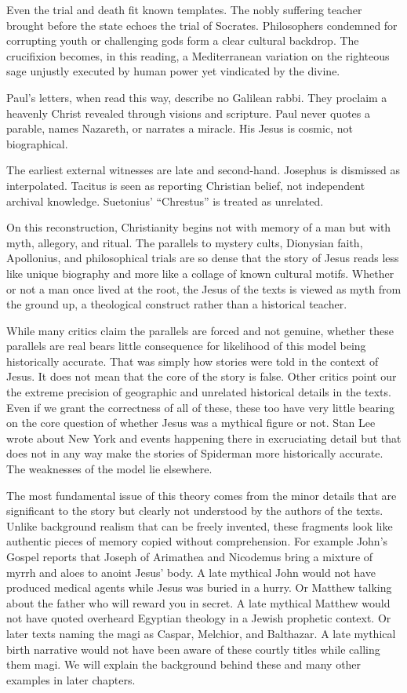 Even the trial and death fit known templates.
The nobly suffering teacher brought before the state echoes the trial of Socrates.
Philosophers condemned for corrupting youth or challenging gods form a clear cultural backdrop.
The crucifixion becomes, in this reading, a Mediterranean variation on the righteous sage unjustly executed by human power yet vindicated by the divine.

Paul’s letters, when read this way, describe no Galilean rabbi.
They proclaim a heavenly Christ revealed through visions and scripture.
Paul never quotes a parable, names Nazareth, or narrates a miracle.
His Jesus is cosmic, not biographical.

The earliest external witnesses are late and second-hand.
Josephus is dismissed as interpolated.
Tacitus is seen as reporting Christian belief, not independent archival knowledge.
Suetonius’ “Chrestus” is treated as unrelated.

On this reconstruction, Christianity begins not with memory of a man but with myth, allegory, and ritual.
The parallels to mystery cults, Dionysian faith, Apollonius, and philosophical trials are so dense that the story of Jesus reads less like unique biography and more like a collage of known cultural motifs.
Whether or not a man once lived at the root, the Jesus of the texts is viewed as myth from the ground up, a theological construct rather than a historical teacher.

While many critics claim the parallels are forced and not genuine, whether these parallels are real bears little consequence for likelihood of this model being historically accurate.
That was simply how stories were told in the context of Jesus.
It does not mean that the core of the story is false.
Other critics point our the extreme precision of geographic and unrelated historical details in the texts.
Even if we grant the correctness of all of these, these too have very little bearing on the core question of whether Jesus was a mythical figure or not.
Stan Lee wrote about New York and events happening there in excruciating detail but that does not in any way make the stories of Spiderman more historically accurate.
The weaknesses of the model lie elsewhere.

The most fundamental issue of this theory comes from the minor details that are significant to the story but clearly not understood by the authors of the texts.
Unlike background realism that can be freely invented, these fragments look like authentic pieces of memory copied without comprehension.
For example John’s Gospel reports that Joseph of Arimathea and Nicodemus bring a mixture of myrrh and aloes to anoint Jesus’ body.
A late mythical John would not have produced medical agents while Jesus was buried in a hurry.
Or Matthew talking about the father who will reward you in secret.
A late mythical Matthew would not have quoted overheard Egyptian theology in a Jewish prophetic context.
Or later texts naming the magi as Caspar, Melchior, and Balthazar.
A late mythical birth narrative would not have been aware of these courtly titles while calling them magi.
We will explain the background behind these and many other examples in later chapters.

